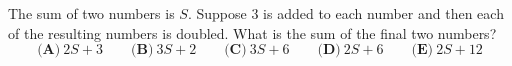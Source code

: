 The sum of two numbers is $S$. Suppose $3$ is added to each number and then each of the resulting numbers is doubled. What is the sum of the final two numbers?
\[\textbf{(A)}\ 2S+3\qquad\textbf{(B)}\ 3S+2\qquad\textbf{(C)}\ 3S+6\qquad\textbf{(D)}\ 2S+6\qquad\textbf{(E)}\ 2S+12\]
